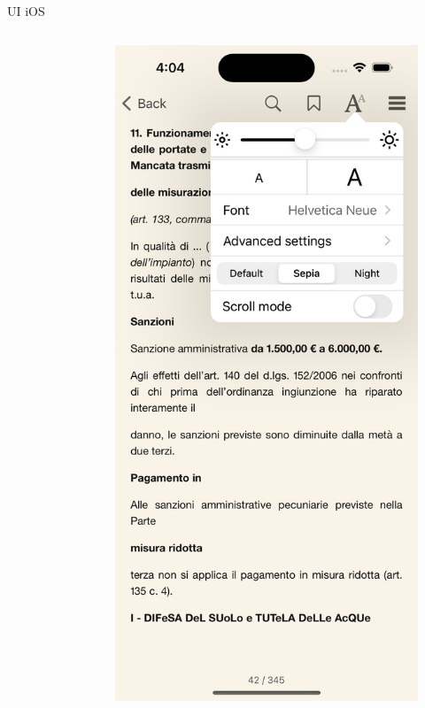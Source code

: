 \begin{frame}{UI iOS}
\begin{columns}[onlytextwidth]
\begin{column}{0.24\textwidth}
\begin{figure}[H]
            \end{figure}
        \end{column}
        \begin{column}{0.24\textwidth}
             \begin{figure}[H]
                \includegraphics[width=1\textwidth]{img/reader_settings_ios.png}
            \end{figure}
        \end{column}
    \end{columns}
\end{frame}
